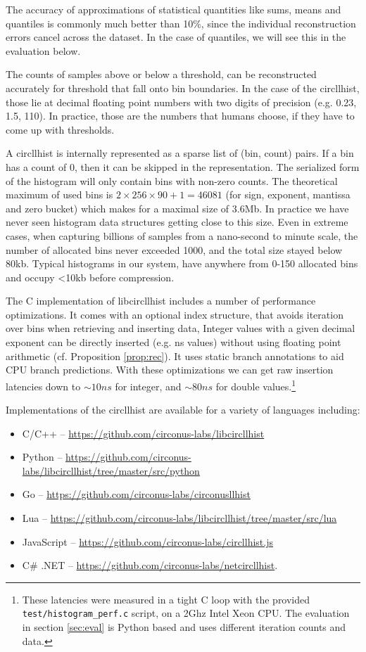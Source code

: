 \documentclass{article}
\theoremstyle{plain}
\theoremstyle{remark}
\begin{document}
The accuracy of approximations of statistical quantities like sums, means and quantiles is commonly
much better than 10\%, since the individual reconstruction errors cancel across the dataset.
In the case of quantiles, we will see this in the evaluation below.

The counts of samples above or below a threshold, can be reconstructed accurately for threshold
that fall onto bin boundaries. In the case of the circllhist, those lie at decimal floating point
numbers with two digits of precision (e.g. 0.23, 1.5, 110). In practice, those are the numbers
that humans choose, if they have to come up with thresholds.

A circllhist is internally represented as a sparse list of (bin, count) pairs.  If a bin has a count
of 0, then it can be skipped in the representation.  The serialized form of the histogram will only
contain bins with non-zero counts.  The theoretical maximum of used bins is $2 \times 256 \times 90
+ 1 = 46081$ (for sign, exponent, mantissa and zero bucket) which makes for a maximal size of 3.6Mb.
In practice we have never seen histogram data structures getting close to this size.  Even in
extreme cases, when capturing billions of samples from a nano-second to minute scale, the number of
allocated bins never exceeded 1000, and the total size stayed below 80kb.
Typical histograms in our system, have anywhere from 0-150 allocated bins and occupy <10kb
before compression.

The C implementation of libcircllhist includes a number of performance optimizations.  It comes with
an optional index structure, that avoids iteration over bins when retrieving and inserting data,
Integer values with a given decimal exponent can be directly inserted (e.g. ns values) without using
floating point arithmetic (cf. Proposition \ref{prop:rec}).  It uses static branch annotations to
aid CPU branch predictions.  With these optimizations we can get raw insertion latencies down to
$\sim 10ns$ for integer, and $\sim 80ns$ for double values.\footnote{ These latencies were measured
in a tight C loop with the provided \texttt{test/histogram\_perf.c} script, on a 2Ghz Intel Xeon
CPU.  The evaluation in section \ref{sec:eval} is Python based and uses different iteration counts
and data. }

Implementations of the circllhist are available for a variety of languages including:
\begin{itemize}
\item C/C++ -- \url{https://github.com/circonus-labs/libcircllhist}
\item Python -- \url{https://github.com/circonus-labs/libcircllhist/tree/master/src/python}
\item Go -- \url{https://github.com/circonus-labs/circonusllhist}
\item Lua -- \url{https://github.com/circonus-labs/libcircllhist/tree/master/src/lua}
\item JavaScript -- \url{https://github.com/circonus-labs/circllhist.js}
\item C\# .NET -- \url{https://github.com/circonus-labs/netcircllhist}.
\end{itemize}
\end{document}
